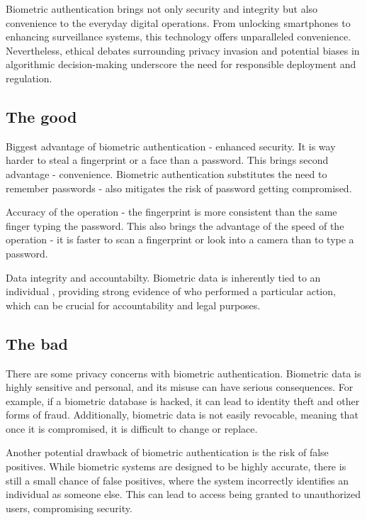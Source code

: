 \hspace{1 em} Biometric authentication brings not only security and integrity but also convenience
to the everyday digital operations. From unlocking smartphones to enhancing surveillance systems, this technology offers unparalleled convenience. Nevertheless, ethical debates surrounding privacy invasion and potential biases in algorithmic decision-making underscore the need for responsible deployment and regulation.
\subsection{The good}
\hspace{1 em} Biggest advantage of biometric authentication - enhanced security. It is way harder
to steal a fingerprint or a face than a password. This brings second advantage - convenience. Biometric
authentication substitutes the need to remember passwords - also mitigates the risk of password getting compromised.

Accuracy of the operation - the fingerprint is more consistent than the same finger 
typing the password. This also brings the advantage of the speed of the operation -
it is faster to scan a fingerprint or look into a camera than to type a password.

Data integrity and accountabilty. Biometric data is inherently tied to an individual
, providing strong evidence of who performed 
a particular action, which can be crucial for accountability and legal purposes.

\subsection{The bad}
\hspace{1 em} There are some privacy concerns with biometric authentication. Biometric 
data is highly sensitive and personal, and its misuse can have serious consequences. 
For example, if a biometric database is hacked, it can lead to identity theft and
other forms of fraud. Additionally, biometric data is not easily revocable, meaning
that once it is compromised, it is difficult to change or replace.

Another potential drawback of biometric authentication is the risk of false positives.
While biometric systems are designed to be highly accurate, there is still a small
chance of false positives, where the system incorrectly identifies an individual
as someone else. This can lead to access being granted to unauthorized users,
compromising security.

